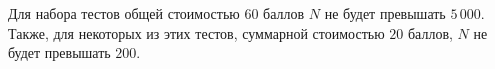 Для набора тестов общей стоимостью $60$ баллов $N$ не будет превышать $5\,000$.
Также, для некоторых из этих тестов, суммарной стоимостью $20$ баллов, $N$ не будет превышать $200$.